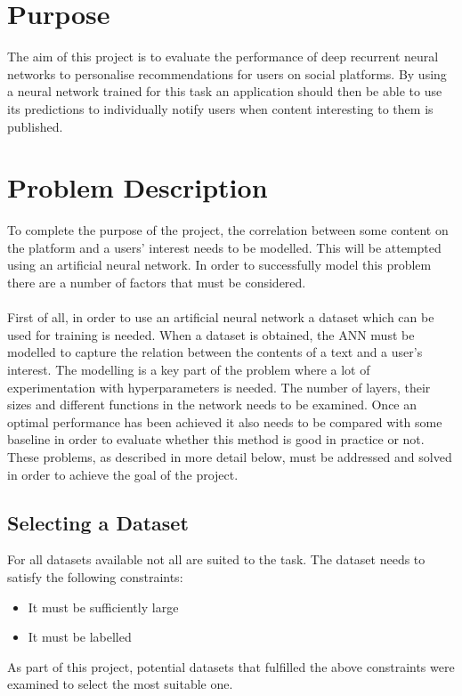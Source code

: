 \section{Purpose}
The aim of this project is to evaluate the performance of deep recurrent neural networks to personalise recommendations for users on social platforms. By using a neural network trained for this task an application should then be able to use its predictions to individually notify users when content interesting to them is published.

\section{Problem Description}
To complete the purpose of the project, the correlation between some content on the platform and a users' interest needs to be modelled. This will be attempted using an artificial neural network. In order to successfully model this problem there are a number of factors that must be considered.
\\\\
First of all, in order to use an artificial neural network a dataset which can be used for training is needed. When a dataset is obtained, the ANN must be modelled to capture the relation between the contents of a text and a user's interest. The modelling is a key part of the problem where a lot of experimentation with hyperparameters is needed. The number of layers, their sizes and different functions in the network needs to be examined. Once an optimal performance has been achieved it also needs to be compared with some baseline in order to evaluate whether this method is good in practice or not. These problems, as described in more detail below,  must be addressed and solved in order to achieve the goal of the project.

\subsection{Selecting a Dataset}\label{sec:select_dataset}
For all datasets available not all are suited to the task. The dataset needs to satisfy the following constraints: 
\vspace*{0.25cm}
\begin{itemize}
    \item It must be sufficiently large
    \item It must be labelled
\end{itemize}
\vspace*{0.25cm}
As part of this project, potential datasets that fulfilled the above constraints were examined to select the most suitable one.

